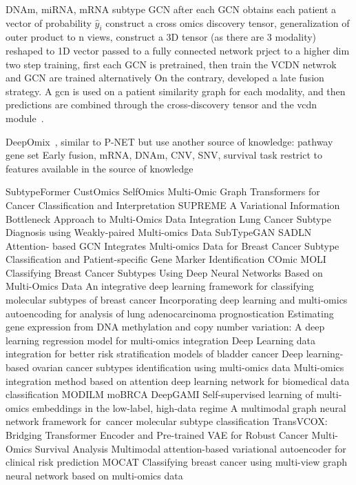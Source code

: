 \documentclass[../main.tex]{subfiles}
\begin{document}
\cite{MOGONET} DNAm, miRNA, mRNA subtype GCN 
after each GCN obtains each patient a vector of probability \(\hat{y}_{i}\)
construct a cross omics discovery tensor, generalization of outer product to n views, construct a 3D tensor (as there are 3 modality) reshaped to 1D vector passed to a fully connected network 
prject to a higher dim 
two step training, first each GCN is pretrained, then train the VCDN netwrok and GCN are trained alternatively
On the contrary, \citeauthor{MOGONET} developed a late fusion strategy.
A \gls{gcn} is used on a patient similarity graph for each modality, and then predictions are combined through the cross-discovery tensor and the \gls{vcdn} module~\cite{MOGONET}.

DeepOmix~\cite{DeepOmix}, similar to P-NET but use another source of knowledge: pathway gene set
Early fusion, mRNA, DNAm, CNV, SNV, survival task
restrict to features available in the source of knowledge

SubtypeFormer
CustOmics
SelfOmics
Multi-Omic Graph Transformers for Cancer Classification and Interpretation
SUPREME
A Variational Information Bottleneck Approach to Multi-Omics Data Integration
Lung Cancer Subtype Diagnosis using Weakly-paired Multi-omics Data
SubTypeGAN
SADLN 
Attention- based GCN Integrates Multi-omics Data for Breast Cancer Subtype Classification and Patient-specific Gene Marker Identification
COmic
MOLI
Classifying Breast Cancer Subtypes Using Deep Neural Networks Based on Multi-Omics Data
An integrative deep learning framework for classifying molecular subtypes of breast cancer
Incorporating deep learning and multi-omics autoencoding for analysis of lung adenocarcinoma prognostication
Estimating gene expression from DNA methylation and copy number variation: A deep learning regression model for multi-omics integration
Deep Learning data integration for better risk stratification models of bladder cancer
Deep learning-based ovarian cancer subtypes identification using multi-omics data
Multi-omics integration method based on attention deep learning network for biomedical data classification
MODILM
moBRCA
DeepGAMI
Self-supervised learning of multi-omics embeddings in the low-label, high-data regime
A multimodal graph neural network framework for cancer molecular subtype classification
TransVCOX: Bridging Transformer Encoder and Pre-trained VAE for Robust Cancer Multi-Omics Survival Analysis
Multimodal attention-based variational autoencoder for clinical risk prediction
MOCAT
Classifying breast cancer using multi-view graph neural network based on multi-omics data
\end{document}
